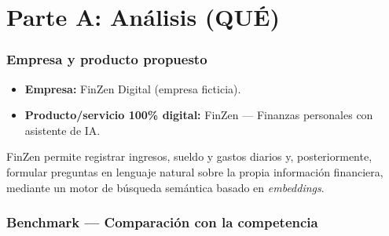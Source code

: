 \documentclass[12pt,letterpaper]{article}
\begin{document}
\clearpage
\part*{Parte A: An\'alisis (QU\'E)}

\section{Empresa y producto propuesto}
\begin{itemize}[leftmargin=1.2cm]
  \item \textbf{Empresa:} FinZen Digital (empresa ficticia).
  \item \textbf{Producto/servicio 100\% digital:} FinZen --- Finanzas personales con
        asistente de IA.
\end{itemize}
FinZen permite registrar ingresos, sueldo y gastos diarios y, posteriormente, formular preguntas
en lenguaje natural sobre la propia informaci\'on financiera, mediante un motor de
b\'usqueda sem\'antica basado en \emph{embeddings}.

\section{Benchmark --- Comparaci\'on con la competencia}
\end{document}
